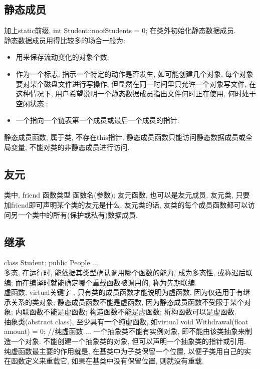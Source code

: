 \documentclass[a4paper,10pt,english]{article}
\begin{document}
\subsection{静态成员}
加上static前缀, int Student::noofStudents = 0; 在类外初始化静态数据成员.\\
静态数据成员用得比较多的场合一般为: \\
\begin{itemize}
\item 用来保存流动变化的对象个数;
\item 作为一个标志, 指示一个特定的动作是否发生, 如可能创建几个对象, 每个对象要对某个磁盘文件进行写操作, 但显然在同一时间里只允许一个对象写文件, 在这种情况下, 用户希望说明一个静态数据成员指出文件何时正在使用, 何时处于空闲状态.;
\item 一个指向一个链表第一个成员或最后一个成员的指针.
\end{itemize}

静态成员函数, 属于类, 不存在this指针, 静态成员函数只能访问静态数据成员或全局变量, 不能对类的非静态成员进行访问.

\subsection{友元}
类中, friend 函数类型 函数名(参数); 友元函数, 也可以是友元成员, 友元类, 只要加friend即可声明某个类的友元是什么. 友元类的话, 友类的每个成员函数都可以访问另一个类中的所有(保护或私有)数据成员.

\subsection{继承}
class Student: public People {...}\\
多态, 在运行时, 能依据其类型确认调用哪个函数的能力, 成为多态性, 或称迟后联编; 而在编译时就能确定哪个重载函数被调用的, 称为先期联编. \\
虚函数, virtual关键字 , 只有类的成员函数才能说明为虚函数, 因为仅适用于有继承关系的类对象; 静态成员函数不能是虚函数, 因为静态成员函数不受限于某个对象; 内联函数不能是虚函数; 构造函数不能是虚函数; 析构函数可以是虚函数.\\
抽象类(abstract class), 至少具有一个纯虚函数, 如virtual void Withdrawal(float amount) = 0; //纯虚函数 ... 一个抽象类不能有实例对象, 即不能由该类抽象来制造一个对象. 不能创建一个抽象类的对象, 但可以声明一个抽象类的指针或引用. \\
纯虚函数最主要的作用就是, 在基类中为子类保留一个位置, 以便子类用自己的实在函数定义来重载它, 如果在基类中没有保留位置, 则就没有重载.
\end{document}
